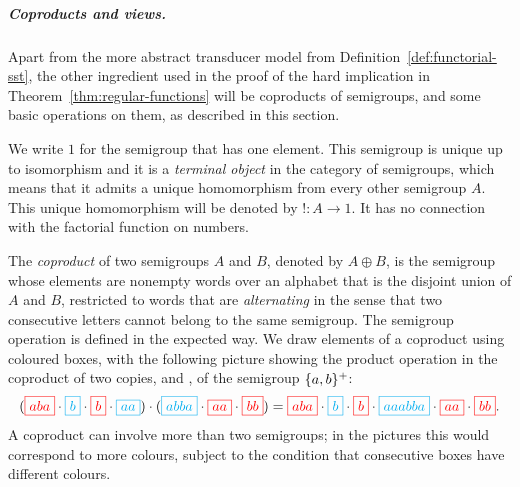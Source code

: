


\subparagraph*{Coproducts and views.}
\label{sec:coproducts-and-views}

Apart from the more abstract transducer model from Definition~\ref{def:functorial-sst}, the other ingredient used  in the proof of the hard implication in Theorem~\ref{thm:regular-functions} will be coproducts of semigroups, and some basic operations on them, as described in this section.

We write $1$ for the semigroup that has one element. This semigroup is unique up to isomorphism and it is a \emph{terminal object} in the category of semigroups, which means that it admits a unique homomorphism from every other semigroup $A$. This unique homomorphism will be denoted by $! : A \to 1$. It has no connection with the factorial function on numbers. 


The \emph{coproduct}  of two semigroups $A$ and $B$, denoted by $A \oplus B$, is the semigroup whose elements are nonempty words over an alphabet that is the disjoint union of $A$ and $B$, restricted to words that are \emph{alternating} in the sense that two consecutive letters cannot belong to the same semigroup. The semigroup operation is defined in the expected way. We draw elements of a coproduct using coloured boxes, with the following picture showing the product operation in the coproduct of two copies,  and , of the semigroup $\{a,b\}^+$:
\begin{align*}
    ({\color{red}\boxed{aba}} \cdot 
    {\color{cyan}\boxed{b}} \cdot 
    {\color{red}\boxed{b}} \cdot 
    {\color{cyan}\boxed{aa}}) \cdot 
    (
        {\color{cyan}\boxed{abba}} \cdot 
        {\color{red}\boxed{aa}} \cdot 
        {\color{red}\boxed{bb}}
    )
    = 
{\color{red}\boxed{aba}} \cdot 
    {\color{cyan}\boxed{b}} \cdot 
    {\color{red}\boxed{b}} \cdot 
    {\color{cyan}\boxed{aaabba}} \cdot 
        {\color{red}\boxed{aa}} \cdot 
        {\color{red}\boxed{bb}}.
\end{align*}
A coproduct can involve more than two semigroups; in the pictures this would correspond to more colours, subject to the condition that  consecutive boxes have different colours.







